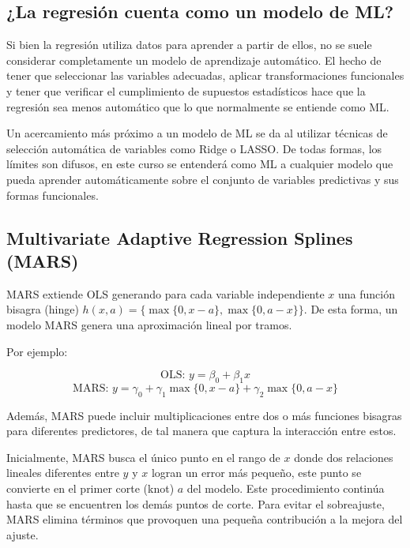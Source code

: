 \documentclass[
]{book}
\begin{document}
\hypertarget{la-regresiuxf3n-cuenta-como-un-modelo-de-ml}{%
\subsection{¿La regresión cuenta como un modelo de ML?}\label{la-regresiuxf3n-cuenta-como-un-modelo-de-ml}}

Si bien la regresión utiliza datos para aprender a partir de ellos, no
se suele considerar completamente un modelo de aprendizaje automático.
El hecho de tener que seleccionar las variables adecuadas, aplicar
transformaciones funcionales y tener que verificar el cumplimiento de
supuestos estadísticos hace que la regresión sea menos automático que lo
que normalmente se entiende como ML.

Un acercamiento más próximo a un modelo de ML se da al utilizar técnicas
de selección automática de variables como Ridge o LASSO. De todas
formas, los límites son difusos, en este curso se entenderá como ML a
cualquier modelo que pueda aprender automáticamente sobre el conjunto de
variables predictivas y sus formas funcionales.

\hypertarget{multivariate-adaptive-regression-splines-mars}{%
\subsection{Multivariate Adaptive Regression Splines (MARS)}\label{multivariate-adaptive-regression-splines-mars}}

MARS extiende OLS generando para cada variable independiente \(x\) una
función bisagra (hinge)
\(h(x, a) = \{ \max\{0, x-a\}, \max\{0, a-x\} \}\). De esta forma, un
modelo MARS genera una aproximación lineal por tramos.

Por ejemplo:

\[\text{OLS: }y = \beta_0 + \beta_1 x\]
\[\text{MARS: }y = \gamma_0 + \gamma_1 \max\{0, x-a\} + \gamma_2 \max\{0, a-x\}\]

Además, MARS puede incluir multiplicaciones entre dos o más funciones
bisagras para diferentes predictores, de tal manera que captura la
interacción entre estos.

Inicialmente, MARS busca el único punto en el rango de \(x\) donde dos
relaciones lineales diferentes entre \(y\) y \(x\) logran un error más
pequeño, este punto se convierte en el primer corte (knot) \(a\) del
modelo. Este procedimiento continúa hasta que se encuentren los demás
puntos de corte. Para evitar el sobreajuste, MARS elimina términos que
provoquen una pequeña contribución a la mejora del ajuste.
\end{document}
